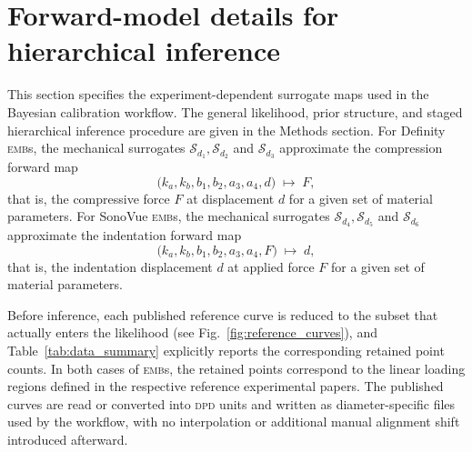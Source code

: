 \documentclass[%
 aip,
 jcp,
 amsmath,amssymb,
 preprint,%
]{revtex4-1}
\begin{document}
\section{Forward-model details for hierarchical inference}
\label{app:hierarchical_derivation}

This section specifies the experiment-dependent surrogate maps used in the Bayesian calibration workflow. The general likelihood, prior structure, and staged hierarchical inference procedure are given in the Methods section. For Definity \textsc{emb}s, the mechanical surrogates $\mathcal{S}_{d_1}, \mathcal{S}_{d_2}$ and $\mathcal{S}_{d_3}$ approximate the compression forward map
  \begin{equation}
    \bigl(k_a, k_b, b_1, b_2, a_3, a_4, d\bigr) \;\mapsto\; F,
  \end{equation}
  that is, the compressive force $F$ at displacement $d$ for a given set of material parameters. For SonoVue \textsc{emb}s, the mechanical surrogates $\mathcal{S}_{d_4},
  \mathcal{S}_{d_5}$ and $\mathcal{S}_{d_6}$ approximate the indentation forward map
  \begin{equation}
    \bigl(k_a, k_b, b_1, b_2, a_3, a_4, F\bigr) \;\mapsto\; d,
  \end{equation}
  that is, the indentation displacement $d$ at applied force $F$ for a given set of material parameters.
  
Before inference, each published reference curve is reduced to the subset that actually enters the likelihood (see Fig.~\ref{fig:reference_curves}), and Table~\ref{tab:data_summary} explicitly reports the corresponding retained point counts. In both cases of \textsc{emb}s, the retained points correspond to the linear loading regions defined in the respective reference experimental papers. The published curves are read or converted into \textsc{dpd} units and written as diameter-specific files used by the workflow, with no interpolation or additional manual alignment shift introduced afterward.
\end{document}
